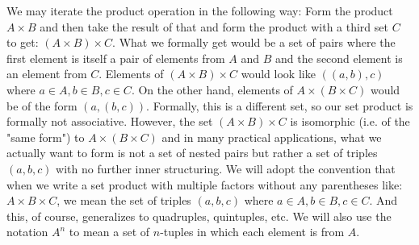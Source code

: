 We may iterate the product operation in the following way: Form the product $A \times B$ and then take the result of that and form the product with a third set $C$ to get: $(A \times B) \times C$. What we formally get would be a set of pairs where the first element is itself a pair of elements from $A$ and $B$ and the second element is an element from $C$. Elements of $(A \times B) \times C$ would look like $((a,b),c)$ where $a \in A, b \in B, c \in C$. On the other hand, elements of $A \times (B \times C)$ would be of the form $(a, (b,c))$. Formally, this is a different set, so our set product is formally not associative. However, the set $(A \times B) \times C$ is isomorphic (i.e. of the "same form") to $A \times (B \times C)$ and in many practical applications, what we actually want to form is not a set of nested pairs but rather a set of triples $(a,b,c)$ with no further inner structuring. We will adopt the convention that when we write a set product with multiple factors without any parentheses like: $A \times B \times C$, we mean the set of triples $(a,b,c)$ where $a \in A, b \in B, c \in C$. And this, of course, generalizes to quadruples, quintuples, etc. We will also use the notation $A^n$ to mean a set of $n$-tuples in which each element is from $A$.


